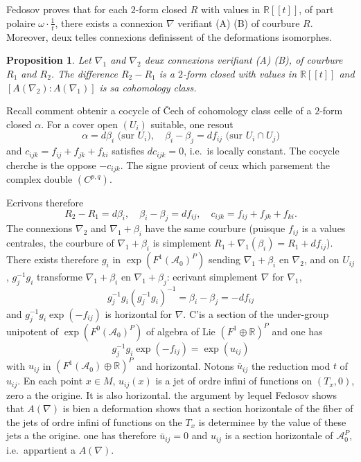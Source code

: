 \documentclass[11pt,a4paper]{article}
\theoremstyle{plain}
\newtheorem{proposition}[theorem]{Proposition}
\theoremstyle{definition}
\newcommand{\R}{\mathbb{R}}
\begin{document}
\subsection{}
Fedosov proves that for each $2$-form closed $R$ with values in $\R[[t]]$, of part polaire $\omega \cdot \frac{1}{t}$, there exists a connexion $\nabla$ verifiant (A) (B) of courbure $R$.
Moreover, deux telles connexions definissent of the deformations isomorphes.

\begin{proposition}
Let $\nabla_{1}$ and $\nabla_{2}$ deux connexions verifiant \emph{(A) (B)}, of courbure $R_{1}$ and $R_{2}$. The difference $R_{2} - R_{1}$ is a $2$-form closed with values in $\R[[t]]$ and $[A(\nabla_{2}) : A(\nabla_{1})]$ is sa cohomology class.
\end{proposition}

Recall comment obtenir a cocycle of \v{C}ech of cohomology class celle of a $2$-form closed $\alpha$. For a cover open $(U_{i})$ suitable, one resout
\[
\alpha = d\beta_{i} \text{ (sur } U_{i}), \quad \beta_{i} - \beta_{j} = df_{ij} \text{ (sur } U_{i} \cap U_{j})
\]
and $c_{ijk} = f_{ij} + f_{jk} + f_{ki}$ satisfies $dc_{ijk} = 0$, i.e.\ is locally constant. The cocycle
cherche is the oppose $-c_{ijk}$. The signe provient of ceux which parsement the complex double $(C^{p,q})$.

Ecrivons therefore
\[
R_{2} - R_{1} = d\beta_{i}, \quad \beta_{i} - \beta_{j} = df_{ij}, \quad c_{ijk} = f_{ij} + f_{jk} + f_{ki}.
\]
The connexions $\nabla_{2}$ and $\nabla_{1} + \beta_{i}$ have the same courbure (puisque $f_{ij}$ is a values
centrales, the courbure of $\nabla_{1} + \beta_{i}$ is simplement $R_{1} + \nabla_{1}(\beta_{i}) = R_{1} + df_{ij}$). There exists
therefore $g_{i}$ in $\exp(F^{1}(\mathcal{A}_{0})^{P})$ sending $\nabla_{1} + \beta_{i}$ en $\nabla_{2}$, and on $U_{ij}$, $g_{j}^{-1}g_{i}$ transforme $\nabla_{1} + \beta_{i}$ en $\nabla_{1} + \beta_{j}$: ecrivant simplement $\nabla$ for $\nabla_{1}$,
\[
g_{j}^{-1} g_{i} (g_{j}^{-1} g_{i})^{-1} = \beta_{i} - \beta_{j} = -df_{ij}
\]
and $g_{j}^{-1} g_{i} \exp(-f_{ij})$ is horizontal for $\nabla$. C'is a section of the under-group unipotent of $\exp(F^{0}(\mathcal{A}_{0})^{P})$ of algebra of Lie $(F^{1} \oplus \R)^{P}$ and one has
\[
g_{j}^{-1} g_{i} \exp(-f_{ij}) = \exp(u_{ij})
\]
with $u_{ij}$ in $(F^{1}(\mathcal{A}_{0}) \oplus \R)^{P}$ and horizontal. Notons $\bar{u}_{ij}$ the reduction mod $t$ of $u_{ij}$.
En each point $x \in M$, $u_{ij}(x)$ is a jet of ordre infini of functions on $(T_{x}, 0)$, zero
a the origine. It is also horizontal. the argument by lequel Fedosov shows that $A(\nabla)$
is bien a deformation shows that a section horizontale of the fiber of the jets of ordre infini of functions on the $T_{x}$ is determinee by the value of these jets a the origine. one has therefore $\bar{u}_{ij} = 0$ and $u_{ij}$ is a section horizontale of $\mathcal{A}_{0}^{P}$, i.e.\ appartient a $A(\nabla)$.
\end{document}
